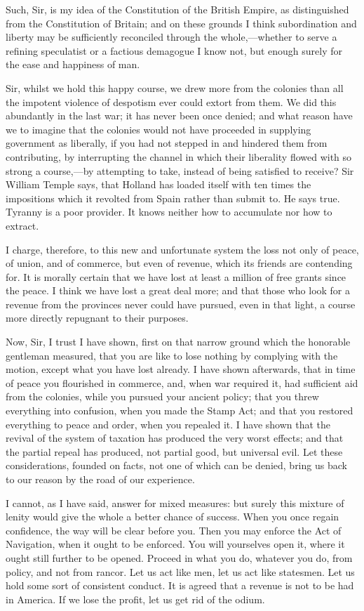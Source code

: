 Such, Sir, is my idea of the Constitution of the British Empire, as distinguished from the Constitution of Britain; and on these grounds I think subordination and liberty may be sufficiently reconciled through the whole,—whether to serve a refining speculatist or a factious demagogue I know not, but enough surely for the ease and happiness of man.

Sir, whilst we hold this happy course, we drew more from the colonies than all the impotent violence of despotism ever could extort from them. We did this abundantly in the last war; it has never been once denied; and what reason have we to imagine that the colonies would not have proceeded in supplying government as liberally, if you had not stepped in and hindered them from contributing, by interrupting the channel in which their liberality flowed with so strong a course,—by attempting to take, instead of being satisfied to receive? Sir William Temple says, that Holland has loaded itself with ten times the impositions which it revolted from Spain rather than submit to. He says true. Tyranny is a poor provider. It knows neither how to accumulate nor how to extract.

I charge, therefore, to this new and unfortunate system the loss not only of peace, of union, and of commerce, but even of revenue, which its friends are contending for. It is morally certain that we have lost at least a million of free grants since the peace. I think we have lost a great deal more; and that those who look for a revenue from the provinces never could have pursued, even in that light, a course more directly repugnant to their purposes.

Now, Sir, I trust I have shown, first on that narrow ground which the honorable gentleman measured, that you are like to lose nothing by complying with the motion, except what you have lost already. I have shown afterwards, that in time of peace you flourished in commerce, and, when war required it, had sufficient aid from the colonies, while you pursued your ancient policy; that you threw everything into confusion, when you made the Stamp Act; and that you restored everything to peace and order, when you repealed it. I have shown that the revival of the system of taxation has produced the very worst effects; and that the partial repeal has produced, not partial good, but universal evil. Let these considerations, founded on facts, not one of which can be denied, bring us back to our reason by the road of our experience.

I cannot, as I have said, answer for mixed measures: but surely this mixture of lenity would give the whole a better chance of success. When you once regain confidence, the way will be clear before you. Then you may enforce the Act of Navigation, when it ought to be enforced. You will yourselves open it, where it ought still further to be opened. Proceed in what you do, whatever you do, from policy, and not from rancor. Let us act like men, let us act like statesmen. Let us hold some sort of consistent conduct. It is agreed that a revenue is not to be had in America. If we lose the profit, let us get rid of the odium.


